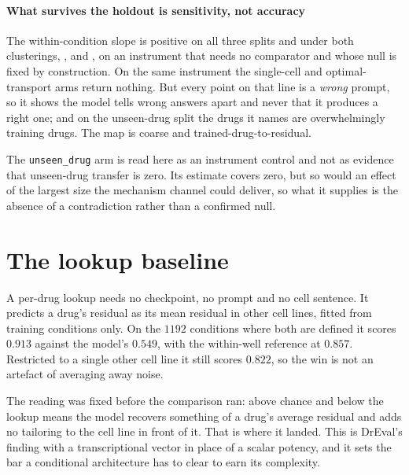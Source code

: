 \paragraph{What survives the holdout is sensitivity, not accuracy} The
within-condition slope is positive on all three splits and under both
clusterings, ,  and
, on an instrument that needs no comparator and whose
null is fixed by construction. On the same instrument the single-cell and
optimal-transport arms return nothing. But every point on that line is a
\emph{wrong} prompt, so it shows the model tells wrong answers apart and never
that it produces a right one; and on the unseen-drug split the drugs it names are
overwhelmingly training drugs. The map is coarse and trained-drug-to-residual.

\begin{scopelimit}
The \texttt{unseen\_drug} arm is read here as an instrument control and not as
evidence that unseen-drug transfer is zero. Its estimate covers zero, but so
would an effect of the largest size the mechanism channel could deliver, so what
it supplies is the absence of a contradiction rather than a confirmed null.
\end{scopelimit}

\section{The lookup baseline}

A per-drug lookup needs no checkpoint, no prompt and no cell
sentence. It predicts a drug's residual as its mean residual in other cell
lines, fitted from training conditions only. On the $\num{1192}$ conditions where
both are defined it scores $0.913$ against the model's $0.549$, with the
within-well reference at $0.857$. Restricted to a single other cell line it still
scores $0.822$, so the win is not an artefact of averaging away noise.

The reading was fixed before the comparison ran: above chance and below the
lookup means the model recovers something of a drug's average residual and adds
no tailoring to the cell line in front of it. That is where it landed. This is
DrEval's finding with a transcriptional vector in place of a scalar potency, and
it sets the bar a conditional architecture has to clear to earn its complexity.

